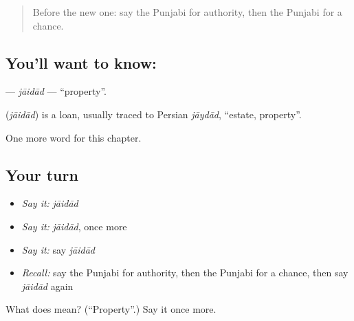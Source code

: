\label{lesson:PA-C110-jaidad}



\begin{quote}
Before the new one: say the Punjabi for authority, then the Punjabi for a chance.
\end{quote}

\subsection*{You'll want to know: }
\textbf{} — \emph{jāidād} — \textquotedblleft{}property\textquotedblright{}.

\begin{cousinweb}
\textbf{} (\emph{jāidād}) is a loan, usually traced to Persian \emph{jāydād}, \textquotedblleft{}estate, property\textquotedblright{}.
\end{cousinweb}

\begin{grammarlens}[title={What you've built}]
One more word for this chapter.
\end{grammarlens}

\subsection*{Your turn}
\begin{itemize}
\raggedright
  \item \emph{Say it:} \emph{jāidād}
  \item \emph{Say it:} \emph{jāidād}, once more
  \item \emph{Say it:} say \emph{jāidād}
  \item \emph{Recall:} say the Punjabi for authority, then the Punjabi for a chance, then say \emph{jāidād} again
\end{itemize}

\begin{tcolorbox}[breakable,colback=teal!4,colframe=teal!35!black,title={Before you move on}]
What does  mean? (\textquotedblleft{}Property\textquotedblright{}.) Say it once more.
\end{tcolorbox}
